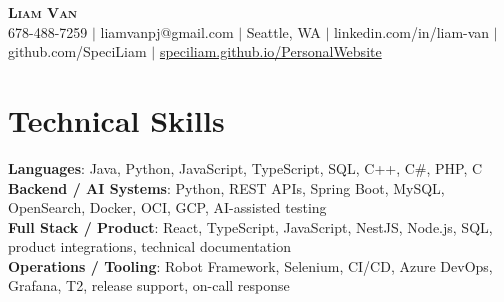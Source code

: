 \documentclass[letterpaper,11pt]{article}
\begin{document}

%
\begin{center}
    \textbf{\Huge \scshape Liam Van} \\ \vspace{1pt}
    \small 678-488-7259 $|$ \small {liamvanpj@gmail.com} $|$ Seattle, WA
 {{$|$ linkedin.com/in/liam-van} {$|$ github.com/SpeciLiam} {$|$ \href{https://speciliam.github.io/PersonalWebsite}{speciliam.github.io/PersonalWebsite}}}

\end{center}

\section{Technical Skills}
 \begin{itemize}[leftmargin=0.15in, label={}]
    \small{\item{
     \textbf{Languages}{: Java, Python, JavaScript, TypeScript, SQL, C++, C\#, PHP, C} \\
     \textbf{Backend / AI Systems}{: Python, REST APIs, Spring Boot, MySQL, OpenSearch, Docker, OCI, GCP, AI-assisted testing} \\
     \textbf{Full Stack / Product}{: React, TypeScript, JavaScript, NestJS, Node.js, SQL, product integrations, technical documentation} \\
     \textbf{Operations / Tooling}{: Robot Framework, Selenium, CI/CD, Azure DevOps, Grafana, T2, release support, on-call response} \\
    }}
 \end{itemize}
%
\end{document}

